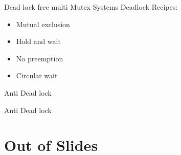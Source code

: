 \documentclass[aspectratio=169,notes]{beamer}
\begin{document}
	\begin{frame}[fragile]{Dead lock free multi Mutex Systems}
		Deadlock Recipes:\\
		\begin{itemize}
			\item Mutual exclusion
			\item Hold and wait
			\item No preemption
			\item Circular wait
		\end{itemize}
	\end{frame}

	\begin{frame}[fragile]{Anti Dead lock}
		
		\hfill{}
		
	\end{frame}

	\begin{frame}[fragile]{Anti Dead lock}
		
		\pause
		
	\end{frame}

	\section{Out of Slides}
\end{document}

